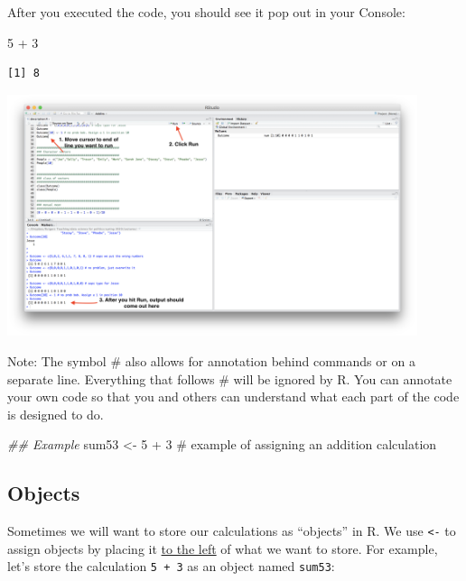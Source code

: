 \documentclass[
  letterpaper,
  DIV=11,
  numbers=noendperiod]{scrreprt}
\newenvironment{Shaded}{\begin{snugshade}}{\end{snugshade}}
\newcommand{\CommentTok}[1]{\textcolor[rgb]{0.37,0.37,0.37}{#1}}
\newcommand{\DecValTok}[1]{\textcolor[rgb]{0.68,0.00,0.00}{#1}}
\newcommand{\DocumentationTok}[1]{\textcolor[rgb]{0.37,0.37,0.37}{\textit{#1}}}
\newcommand{\NormalTok}[1]{\textcolor[rgb]{0.00,0.23,0.31}{#1}}
\newcommand{\OtherTok}[1]{\textcolor[rgb]{0.00,0.23,0.31}{#1}}
\newcommand{\SpecialCharTok}[1]{\textcolor[rgb]{0.37,0.37,0.37}{#1}}
\begin{document}
After you executed the code, you should see it pop out in your Console:

\begin{Shaded}
\begin{Highlighting}[]
\DecValTok{5} \SpecialCharTok{+} \DecValTok{3}
\end{Highlighting}
\end{Shaded}

\begin{verbatim}
[1] 8
\end{verbatim}

\includegraphics[width=0.9\textwidth,height=\textheight]{images/runningcode.png}

Note: The symbol \# also allows for annotation behind commands or on a
separate line. Everything that follows \# will be ignored by R. You can
annotate your own code so that you and others can understand what each
part of the code is designed to do.

\begin{Shaded}
\begin{Highlighting}[]
\DocumentationTok{\#\# Example}
\NormalTok{sum53 }\OtherTok{\textless{}{-}} \DecValTok{5} \SpecialCharTok{+} \DecValTok{3} \CommentTok{\# example of assigning an addition calculation}
\end{Highlighting}
\end{Shaded}

\hypertarget{objects}{%
\subsection{Objects}\label{objects}}

Sometimes we will want to store our calculations as ``objects'' in R. We
use \texttt{\textless{}-} to assign objects by placing it
\href{https://www.youtube.com/watch?v=vLZA67L7gIo\&ab_channel=BeyonceSasha1}{to
the left} of what we want to store. For example, let's store the
calculation \texttt{5\ +\ 3} as an object named \texttt{sum53}:
\end{document}
